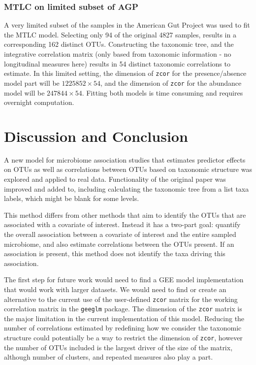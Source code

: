 \documentclass[12pt]{article}
\begin{document}
\subsubsection{MTLC on limited subset of AGP}

A very limited subset of the samples in the American Gut Project was used to fit the MTLC model. Selecting only 94 of the original 4827 samples, results in a corresponding 162 distinct OTUs. Constructing the taxonomic tree, and the integrative correlation matrix (only based from taxonomic information - no longitudinal measures here) results in 54 distinct taxonomic correlations to estimate. In this limited setting, the dimension of \texttt{zcor} for the presence/absence model part will be $1225852 \times 54$, and the dimension of \texttt{zcor} for the abundance model will be $247844 \times 54$. Fitting both models is time consuming and requires overnight computation.


\section{Discussion and Conclusion}

A new model for microbiome association studies that estimates predictor effects on OTUs as well as correlations between OTUs based on taxonomic structure was explored and applied to real data. Functionality of the original paper was improved and added to, including calculating the taxonomic tree from a list taxa labels, which might be blank for some levels.

This method differs from other methods that aim to identify the OTUs that are associated with a covariate of interest. Instead it has a two-part goal: quantify the overall association between a covariate of interest and the entire sampled microbiome, and also estimate correlations between the OTUs present. If an association is present, this method does not identify the taxa driving this association.

The first step for future work would need to find a GEE model implementation that would work with larger datasets. We would need to find or create an alternative to the current use of the user-defined \texttt{zcor} matrix for the working correlation matrix in the \texttt{geeglm} package. The dimension of the \texttt{zcor} matrix is the major limitation in the current implementation of this model. Reducing the number of correlations estimated by redefining how we consider the taxonomic structure could potentially be a way to restrict the dimension of \texttt{zcor}, however the number of OTUs included is the largest driver of the size of the matrix, although number of clusters, and repeated measures also play a part.
\end{document}
